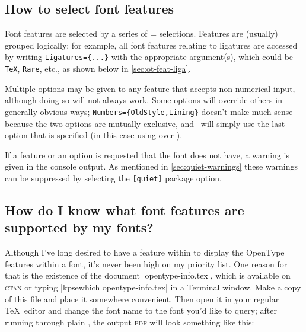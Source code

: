 \documentclass[a4paper]{l3doc}
\begin{document}
\subsection{How to select font features}

Font features are selected by a series of =
selections. Features are (usually) grouped logically; for example, all
font features relating to ligatures are accessed by writing \verb|Ligatures={...}| with the appropriate argument(s), which could be \texttt{TeX}, \texttt{Rare}, etc., as shown below in \ref{sec:ot-feat-liga}.

Multiple options may be given to
any feature that accepts non-numerical input, although doing so will
not always work. Some options will override others in generally
obvious ways; \Verb|Numbers={OldStyle,Lining}| doesn't make much
sense because the two options are mutually exclusive, and \XeTeX\
will simply use the last option that is specified (in this case
using  over ).

If a feature or an option is requested that the font does not have,
a warning is given in the console output. As mentioned in \vref{sec:quiet-warnings}
these warnings can be suppressed by selecting the \texttt{[quiet]} package option.

\subsection{How do I know what font features are supported by my fonts?}

Although I've long desired to have a feature within  to display the OpenType features within a font, it's never been high on my priority list.
One reason for that is the existence of the document |opentype-info.tex|, which is available on \textsc{ctan} or typing |kpsewhich opentype-info.tex| in a Terminal window.
Make a copy of this file and place it somewhere convenient.
Then open it in your regular \TeX\ editor and change the font name to the font you'd like to query; after running through plain \XeTeX, the output \textsc{pdf} will look something like this:
\end{document}
